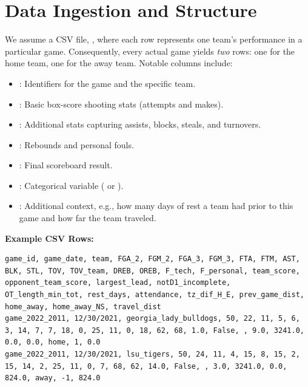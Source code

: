\documentclass[12pt]{article}
\begin{document}
\section{Data Ingestion and Structure}
We assume a CSV file, , where each row represents one team's performance in a particular game. Consequently, every actual game yields \emph{two} rows: one for the home team, one for the away team. Notable columns include:

\begin{itemize}[noitemsep]
    \item {}: Identifiers for the game and the specific team.
    \item {}: Basic box-score shooting stats (attempts and makes).
    \item {}: Additional stats capturing assists, blocks, steals, and turnovers.
    \item {}: Rebounds and personal fouls.
    \item {}: Final scoreboard result.
    \item {}: Categorical variable ( or ).
    \item {}: Additional context, e.g., how many days of rest a team had prior to this game and how far the team traveled.
\end{itemize}

\noindent
\textbf{Example CSV Rows:}
\begin{verbatim}
game_id, game_date, team, FGA_2, FGM_2, FGA_3, FGM_3, FTA, FTM, AST, BLK, STL, TOV, TOV_team, DREB, OREB, F_tech, F_personal, team_score, opponent_team_score, largest_lead, notD1_incomplete, OT_length_min_tot, rest_days, attendance, tz_dif_H_E, prev_game_dist, home_away, home_away_NS, travel_dist
game_2022_2011, 12/30/2021, georgia_lady_bulldogs, 50, 22, 11, 5, 6, 3, 14, 7, 7, 18, 0, 25, 11, 0, 18, 62, 68, 1.0, False, , 9.0, 3241.0, 0.0, 0.0, home, 1, 0.0
game_2022_2011, 12/30/2021, lsu_tigers, 50, 24, 11, 4, 15, 8, 15, 2, 15, 14, 2, 25, 11, 0, 7, 68, 62, 14.0, False, , 3.0, 3241.0, 0.0, 824.0, away, -1, 824.0
\end{verbatim}
\end{document}
